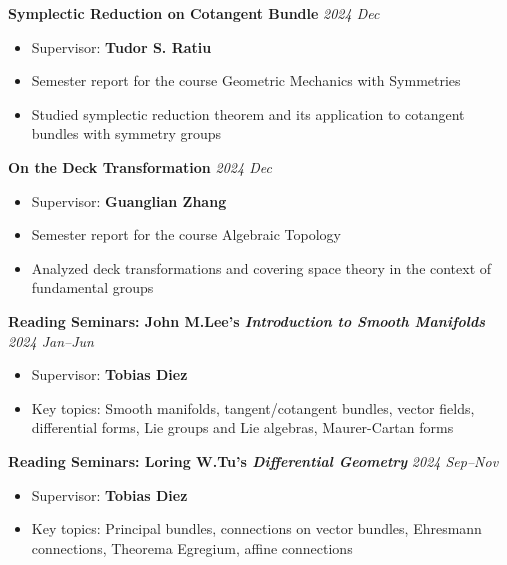 \documentclass[12pt]{article}
\begin{document}
\noindent\textbf{Symplectic Reduction on Cotangent Bundle} \hfill \textit{2024 Dec}
\vspace{0.1cm}
\begin{itemize}[noitemsep, topsep=0pt, partopsep=0pt, parsep=0pt, leftmargin=0.3cm]
  \item Supervisor: \textbf{Tudor S. Ratiu}
  \item Semester report for the course Geometric Mechanics with Symmetries
  \item Studied symplectic reduction theorem and its application to cotangent bundles with symmetry groups
\end{itemize}

\noindent\textbf{On the Deck Transformation} \hfill \textit{2024 Dec}
\vspace{0.1cm}
\begin{itemize}[noitemsep, topsep=0pt, partopsep=0pt, parsep=0pt, leftmargin=0.3cm]
  \item Supervisor: \textbf{Guanglian Zhang}
  \item Semester report for the course Algebraic Topology
  \item Analyzed deck transformations and covering space theory in the context of fundamental groups
\end{itemize}






\vspace{0.3cm}

\vspace{0.3cm}

\noindent\textbf{Reading Seminars: John M.Lee's \emph{Introduction to Smooth Manifolds}} \hfill \textit{2024 Jan--Jun}


\begin{itemize}[noitemsep, topsep=0pt, partopsep=0pt, parsep=0pt, leftmargin=0.2cm]
  \item Supervisor: \textbf{Tobias Diez}
  \item Key topics: Smooth manifolds, tangent/cotangent bundles, vector fields, differential forms, Lie groups and Lie algebras, Maurer-Cartan forms
\end{itemize}

\noindent\textbf{Reading Seminars: Loring W.Tu's \emph{Differential Geometry}} \hfill \textit{2024 Sep--Nov}
\vspace{0.1cm}
\begin{itemize}[noitemsep, topsep=0pt, partopsep=0pt, parsep=0pt, leftmargin=0.3cm]
  \item Supervisor: \textbf{Tobias Diez}
  \item Key topics: Principal bundles, connections on vector bundles, Ehresmann connections, Theorema Egregium, affine connections
\end{itemize}
\end{document}
